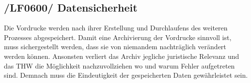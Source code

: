 \subsection{/LF0600/ Datensicherheit}
Die Vordrucke werden nach ihrer Erstellung und Durchlaufens des weiteren Prozesses abgespeichert.
Damit eine Archivierung der Vordrucke sinnvoll ist, muss sichergestellt werden, dass sie von niemandem  
nachträglich verändert werden können. Ansonsten verliert das Archiv jegliche juristische Relevanz und das THW die Möglichkeit nachzuvollziehen wo und warum Fehler aufgetreten sind. Demnach muss die Eindeutigkeit der gespeicherten Daten gewährleistet sein. 
